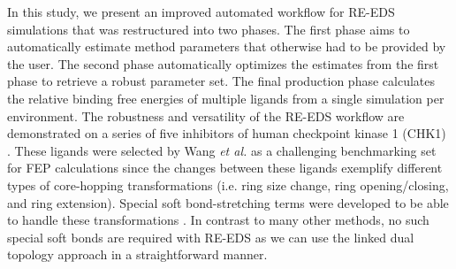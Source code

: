 In this study, we present an improved automated workflow for RE-EDS simulations that was restructured into two phases. The first phase aims to automatically estimate method parameters that otherwise had to be provided by the user. The second phase automatically optimizes the estimates from the first phase to retrieve a robust parameter set. The final production phase calculates the relative binding free energies of multiple ligands from a single simulation per environment. 
The robustness and versatility of the RE-EDS workflow are demonstrated on a series of five inhibitors of human checkpoint kinase 1 (CHK1) \cite{Huang2012}.
These ligands were selected by Wang \textit{et al.} \cite{Wang2017} as a challenging benchmarking set for FEP calculations since the changes between these ligands exemplify different types of core-hopping transformations (i.e. ring size change, ring opening/closing, and ring extension). Special soft bond-stretching terms were developed to be able to handle these transformations \cite{Wang2017}. In contrast to many other methods, no such special soft bonds are required with RE-EDS as we can use the linked dual topology approach \cite{Riniker2011} in a straightforward manner. 
\FloatBarrier
